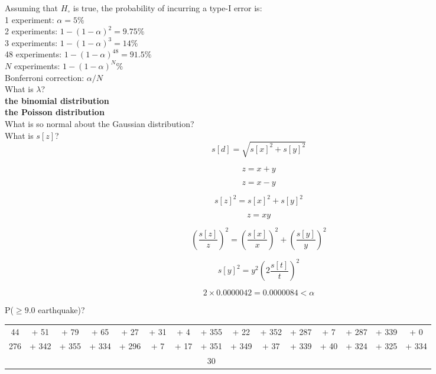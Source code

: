 \documentclass{article}
\begin{document}
Assuming that $H_\circ$ is true, the probability of incurring a type-I
error is:\\

1 experiment: $\alpha = 5\%$\\

2 experiments: $1-(1-\alpha)^2=9.75\%$\\

3 experiments: $1-(1-\alpha)^3=14\%$\\

48 experiments:   $1-(1-\alpha)^{48}=91.5\%$\\

$N$ experiments:   $1-(1-\alpha)^{N}\%$\\

Bonferroni correction: $\alpha/N$\\

What is $\lambda$?\\

\textbf{the binomial distribution}\\

\textbf{the Poisson distribution}\\

What is so normal about the Gaussian distribution?\\

What is $s[z]$?\\

\[
s[d] = \sqrt{s[x]^2 + s[y]^2}
\]

\[
z = x + y
\]

\[
z = x - y
\]

\[
s[z]^2 = s[x]^2 + s[y]^2
\]

\[
z = xy
\]

\[
\left(\frac{s[z]}{z}\right)^2 =
\left(\frac{s[x]}{x}\right)^2 + \left(\frac{s[y]}{y}\right)^2
\]

\[
s[y]^2 = y^2\left(2\frac{s[t]}{t}\right)^2
\]

\[
2 \times 0.0000042 = 0.0000084 < \alpha
\]

P($\geq{9.0}$ earthquake)?

\begin{center}
\begin{tabular}{c@{~}c@{~}c@{~}c@{~}c@{~}c@{~}c@{~}c@{~}c@{~}c@{~}c@{~}c@{~}c@{~}c@{~}c}
  44 & + 51 & + 79 & + 65 & + 27 & + 31 & + 4 & + 355 & +
  22 & + 352 & + 287 & + 7 & + 287 & + 339 & + 0 \\
  276 & + 342 & + 355 & + 334 & + 296 & + 7 & + 17 & +
  351 & + 349 & + 37 & + 339 & + 40 & + 324 & + 325 & + 334\\ \hline
  & & & & & & & 30 & & & & & & & 
\end{tabular}
\end{center}
\end{document}
